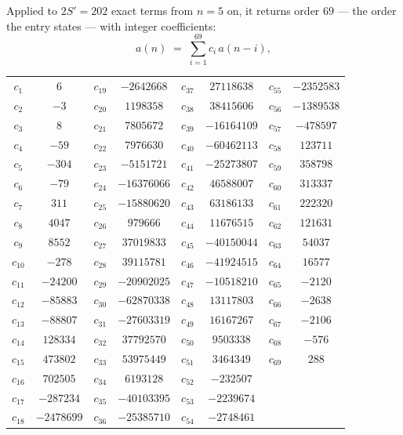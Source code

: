 \documentclass[11pt,a4paper]{article}
\theoremstyle{plain}
\theoremstyle{definition}
\begin{document}
Applied to $2S'=202$ exact terms from $n=5$ on, it returns order $69$ --- the
order the entry states --- with integer coefficients:
\[
a(n)\;=\;\sum_{i=1}^{69}c_i\,a(n-i),
\]
\begin{center}\small
\begin{tabular}{cccccccc}
$c_{1}$ & $6$ & $c_{19}$ & $-2642668$ & $c_{37}$ & $27118638$ & $c_{55}$ & $-2352583$ \\
$c_{2}$ & $-3$ & $c_{20}$ & $1198358$ & $c_{38}$ & $38415606$ & $c_{56}$ & $-1389538$ \\
$c_{3}$ & $8$ & $c_{21}$ & $7805672$ & $c_{39}$ & $-16164109$ & $c_{57}$ & $-478597$ \\
$c_{4}$ & $-59$ & $c_{22}$ & $7976630$ & $c_{40}$ & $-60462113$ & $c_{58}$ & $123711$ \\
$c_{5}$ & $-304$ & $c_{23}$ & $-5151721$ & $c_{41}$ & $-25273807$ & $c_{59}$ & $358798$ \\
$c_{6}$ & $-79$ & $c_{24}$ & $-16376066$ & $c_{42}$ & $46588007$ & $c_{60}$ & $313337$ \\
$c_{7}$ & $311$ & $c_{25}$ & $-15880620$ & $c_{43}$ & $63186133$ & $c_{61}$ & $222320$ \\
$c_{8}$ & $4047$ & $c_{26}$ & $979666$ & $c_{44}$ & $11676515$ & $c_{62}$ & $121631$ \\
$c_{9}$ & $8552$ & $c_{27}$ & $37019833$ & $c_{45}$ & $-40150044$ & $c_{63}$ & $54037$ \\
$c_{10}$ & $-278$ & $c_{28}$ & $39115781$ & $c_{46}$ & $-41924515$ & $c_{64}$ & $16577$ \\
$c_{11}$ & $-24200$ & $c_{29}$ & $-20902025$ & $c_{47}$ & $-10518210$ & $c_{65}$ & $-2120$ \\
$c_{12}$ & $-85883$ & $c_{30}$ & $-62870338$ & $c_{48}$ & $13117803$ & $c_{66}$ & $-2638$ \\
$c_{13}$ & $-88807$ & $c_{31}$ & $-27603319$ & $c_{49}$ & $16167267$ & $c_{67}$ & $-2106$ \\
$c_{14}$ & $128334$ & $c_{32}$ & $37792570$ & $c_{50}$ & $9503338$ & $c_{68}$ & $-576$ \\
$c_{15}$ & $473802$ & $c_{33}$ & $53975449$ & $c_{51}$ & $3464349$ & $c_{69}$ & $288$ \\
$c_{16}$ & $702505$ & $c_{34}$ & $6193128$ & $c_{52}$ & $-232507$ &  &  \\
$c_{17}$ & $-287234$ & $c_{35}$ & $-40103395$ & $c_{53}$ & $-2239674$ &  &  \\
$c_{18}$ & $-2478699$ & $c_{36}$ & $-25385710$ & $c_{54}$ & $-2748461$ &  &  \\
\end{tabular}
\end{center}
\end{document}
